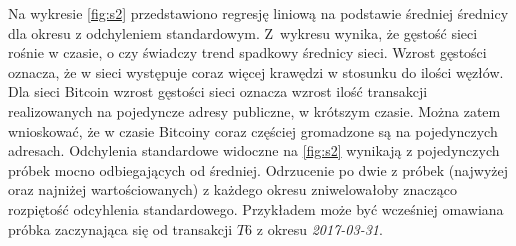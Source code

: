 \documentclass[12pt, twoside, final, openany]{mgr}
\begin{document}
\indent Na wykresie \ref{fig:s2} przedstawiono regresję liniową na podstawie średniej średnicy dla okresu z odchyleniem standardowym. Z~wykresu wynika, że gęstość sieci rośnie w czasie, o czy świadczy trend spadkowy średnicy sieci. Wzrost gęstości oznacza, że w sieci występuje coraz więcej krawędzi w stosunku do ilości węzłów. Dla sieci Bitcoin wzrost gęstości sieci oznacza wzrost ilość transakcji realizowanych na pojedyncze adresy publiczne, w krótszym czasie. Można zatem wnioskować, że w czasie Bitcoiny coraz częściej gromadzone są na pojedynczych adresach. Odchylenia standardowe widoczne na \ref{fig:s2} wynikają z pojedynczych próbek mocno odbiegających od średniej. Odrzucenie po dwie z próbek (najwyżej oraz najniżej wartościowanych) z każdego okresu zniwelowałoby znacząco rozpiętość odcyhlenia standardowego. Przykładem może być wcześniej omawiana próbka zaczynająca się od transakcji $T6$ z okresu \textit{2017-03-31}. 
\end{document}
